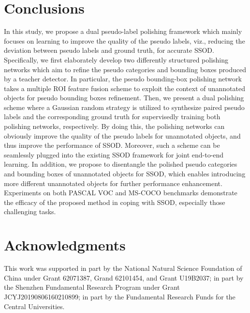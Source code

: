 \documentclass[letterpaper]{article} \usepackage{aaai23}  \usepackage{times}  \usepackage{helvet}  \usepackage{courier}  \usepackage[hyphens]{url}  \usepackage{graphicx} \urlstyle{rm} \def\UrlFont{\rm}  \usepackage{natbib}  \usepackage{caption} \frenchspacing  \setlength{\pdfpagewidth}{8.5in}  \setlength{\pdfpageheight}{11in}  \usepackage{algorithm}
\begin{document}
\section{Conclusions}
In this study, we propose a dual pseudo-label polishing framework which mainly focuses on learning to improve the quality of the pseudo labels, viz., reducing the deviation between pseudo labels and ground truth, for accurate SSOD. Specifically, we first elaborately develop two differently structured polishing networks which aim to refine the pseudo categories and bounding boxes produced by a teacher detector. In particular, the pseudo bounding-box polishing network takes a multiple ROI feature fusion scheme to exploit the context of unannotated objects for pseudo bounding boxes refinement. Then, we present a dual polishing scheme where a Gaussian random strategy is utilized to synthesize paired pseudo labels and the corresponding ground truth 
for supervisedly training both polishing networks, respectively. By doing this, the polishing networks can obviously improve the quality of the pseudo labels for unannotated objects, and thus improve the performance of SSOD. Moreover, such a scheme can be seamlessly plugged into the existing SSOD framework for joint end-to-end learning. In addition, we propose to disentangle the polished pseudo categories and bounding boxes of unannotated objects for SSOD, which enables introducing more different unannotated objects for further performance enhancement. Experiments on both PASCAL VOC and MS-COCO benchmarks demonstrate the efficacy of the proposed method in coping with SSOD, especially those challenging tasks.



\section*{Acknowledgments}
This work was supported in part by the National Natural Science Foundation of China under Grant 62071387, Grand 62101454, and Grant U19B2037; in part by the Shenzhen Fundamental Research Program under Grant JCYJ20190806160210899; in part by the Fundamental Research Funds for the Central Universities. 



\end{document}
